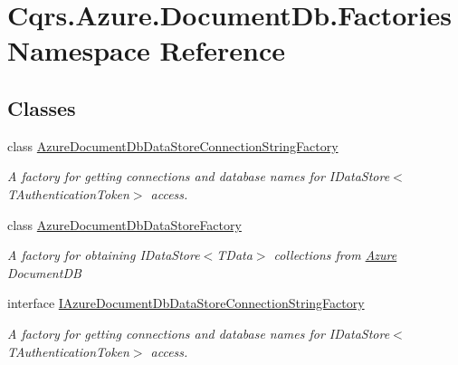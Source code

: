 \hypertarget{namespaceCqrs_1_1Azure_1_1DocumentDb_1_1Factories}{}\section{Cqrs.\+Azure.\+Document\+Db.\+Factories Namespace Reference}
\label{namespaceCqrs_1_1Azure_1_1DocumentDb_1_1Factories}
\subsection*{Classes}
\begin{DoxyCompactItemize}
\item 
class \hyperlink{classCqrs_1_1Azure_1_1DocumentDb_1_1Factories_1_1AzureDocumentDbDataStoreConnectionStringFactory}{Azure\+Document\+Db\+Data\+Store\+Connection\+String\+Factory}
\begin{DoxyCompactList}\small\item\em A factory for getting connections and database names for I\+Data\+Store$<$\+T\+Authentication\+Token$>$ access. \end{DoxyCompactList}\item 
class \hyperlink{classCqrs_1_1Azure_1_1DocumentDb_1_1Factories_1_1AzureDocumentDbDataStoreFactory}{Azure\+Document\+Db\+Data\+Store\+Factory}
\begin{DoxyCompactList}\small\item\em A factory for obtaining I\+Data\+Store$<$\+T\+Data$>$ collections from \hyperlink{namespaceCqrs_1_1Azure}{Azure} Document\+DB \end{DoxyCompactList}\item 
interface \hyperlink{interfaceCqrs_1_1Azure_1_1DocumentDb_1_1Factories_1_1IAzureDocumentDbDataStoreConnectionStringFactory}{I\+Azure\+Document\+Db\+Data\+Store\+Connection\+String\+Factory}
\begin{DoxyCompactList}\small\item\em A factory for getting connections and database names for I\+Data\+Store$<$\+T\+Authentication\+Token$>$ access. \end{DoxyCompactList}\end{DoxyCompactItemize}
